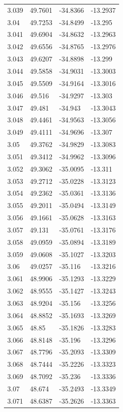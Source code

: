 \begin{tabular}{llll}
3.039 & 49.7601 & -34.8366 & -13.2937 \\
3.04 & 49.7253 & -34.8499 & -13.295 \\
3.041 & 49.6904 & -34.8632 & -13.2963 \\
3.042 & 49.6556 & -34.8765 & -13.2976 \\
3.043 & 49.6207 & -34.8898 & -13.299 \\
3.044 & 49.5858 & -34.9031 & -13.3003 \\
3.045 & 49.5509 & -34.9164 & -13.3016 \\
3.046 & 49.516 & -34.9297 & -13.303 \\
3.047 & 49.481 & -34.943 & -13.3043 \\
3.048 & 49.4461 & -34.9563 & -13.3056 \\
3.049 & 49.4111 & -34.9696 & -13.307 \\
3.05 & 49.3762 & -34.9829 & -13.3083 \\
3.051 & 49.3412 & -34.9962 & -13.3096 \\
3.052 & 49.3062 & -35.0095 & -13.311 \\
3.053 & 49.2712 & -35.0228 & -13.3123 \\
3.054 & 49.2362 & -35.0361 & -13.3136 \\
3.055 & 49.2011 & -35.0494 & -13.3149 \\
3.056 & 49.1661 & -35.0628 & -13.3163 \\
3.057 & 49.131 & -35.0761 & -13.3176 \\
3.058 & 49.0959 & -35.0894 & -13.3189 \\
3.059 & 49.0608 & -35.1027 & -13.3203 \\
3.06 & 49.0257 & -35.116 & -13.3216 \\
3.061 & 48.9906 & -35.1293 & -13.3229 \\
3.062 & 48.9555 & -35.1427 & -13.3243 \\
3.063 & 48.9204 & -35.156 & -13.3256 \\
3.064 & 48.8852 & -35.1693 & -13.3269 \\
3.065 & 48.85 & -35.1826 & -13.3283 \\
3.066 & 48.8148 & -35.196 & -13.3296 \\
3.067 & 48.7796 & -35.2093 & -13.3309 \\
3.068 & 48.7444 & -35.2226 & -13.3323 \\
3.069 & 48.7092 & -35.236 & -13.3336 \\
3.07 & 48.674 & -35.2493 & -13.3349 \\
3.071 & 48.6387 & -35.2626 & -13.3363 \\

\end{tabular}
